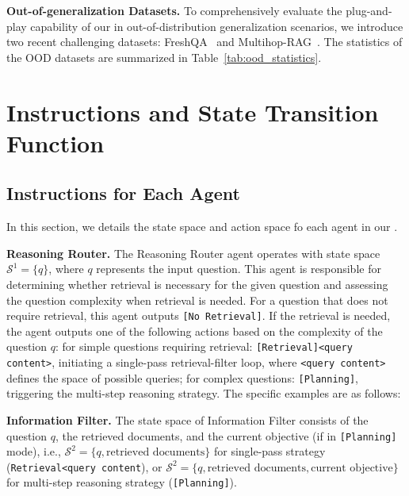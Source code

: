 \textbf{Out-of-generalization Datasets.}
To comprehensively evaluate the plug-and-play capability of our \modelname in out-of-distribution generalization scenarios, we introduce two recent challenging datasets: FreshQA~\citep{VuI0CWWTSZLL24} and Multihop-RAG~\citep{multihop_rag}. 
The statistics of the OOD datasets are summarized in Table~\ref{tab:ood_statistics}.


% 


\section{Instructions and State Transition Function}\label{app:instructions}
\subsection{Instructions for Each Agent}
In this section, we details the state space and action space fo each agent in our \modelname.

\textbf{Reasoning Router.}
The Reasoning Router agent operates with state space $\mathcal{S}^1=\{q\}$, where $q$ represents the input question.
This agent is responsible for determining whether retrieval is necessary for the given question and assessing the question complexity when retrieval is needed.
For a question that does not require retrieval, this agent outputs \texttt{[No Retrieval]}.
If the retrieval is needed, the agent outputs one of the following actions based on the complexity of the question $q$: for simple questions requiring retrieval: \texttt{[Retrieval]<query content>}, initiating a single-pass retrieval-filter loop, where \texttt{<query content>} defines the space of possible queries;
for complex questions: \texttt{[Planning]}, triggering the multi-step reasoning strategy.
The specific examples are as follows:


\textbf{Information Filter.}
The state space of Information Filter consists of the question $q$, the retrieved documents, and the current objective (if in \texttt{[Planning]} mode), i.e., $\mathcal{S}^2=\{q, \text{retrieved documents}\}$ for single-pass strategy (\texttt{Retrieval<query content}), or $\mathcal{S}^2=\{q, \text{retrieved documents}, \text{current objective}\}$ for multi-step reasoning strategy (\texttt{[Planning]}).



